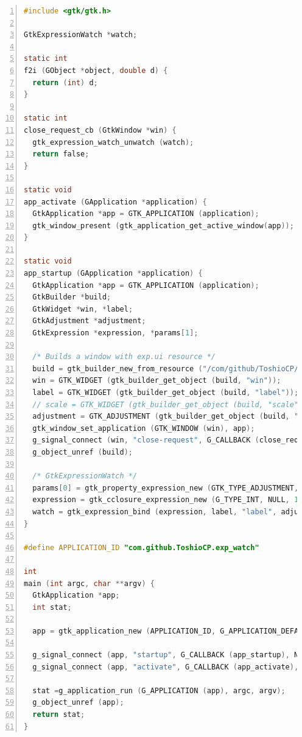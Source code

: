 \begin{lstlisting}[language=C, numbers=left]
#include <gtk/gtk.h>

GtkExpressionWatch *watch;

static int
f2i (GObject *object, double d) {
  return (int) d;
}

static int
close_request_cb (GtkWindow *win) {
  gtk_expression_watch_unwatch (watch);
  return false;
}

static void
app_activate (GApplication *application) {
  GtkApplication *app = GTK_APPLICATION (application);
  gtk_window_present (gtk_application_get_active_window(app));
}

static void
app_startup (GApplication *application) {
  GtkApplication *app = GTK_APPLICATION (application);
  GtkBuilder *build;
  GtkWidget *win, *label;
  GtkAdjustment *adjustment;
  GtkExpression *expression, *params[1];

  /* Builds a window with exp.ui resource */
  build = gtk_builder_new_from_resource ("/com/github/ToshioCP/exp/exp_bind.ui");
  win = GTK_WIDGET (gtk_builder_get_object (build, "win"));
  label = GTK_WIDGET (gtk_builder_get_object (build, "label"));
  // scale = GTK_WIDGET (gtk_builder_get_object (build, "scale"));
  adjustment = GTK_ADJUSTMENT (gtk_builder_get_object (build, "adjustment"));
  gtk_window_set_application (GTK_WINDOW (win), app);
  g_signal_connect (win, "close-request", G_CALLBACK (close_request_cb), NULL);
  g_object_unref (build);

  /* GtkExpressionWatch */
  params[0] = gtk_property_expression_new (GTK_TYPE_ADJUSTMENT, NULL, "value");
  expression = gtk_cclosure_expression_new (G_TYPE_INT, NULL, 1, params, G_CALLBACK (f2i), NULL, NULL);
  watch = gtk_expression_bind (expression, label, "label", adjustment); /* watch takes the ownership of the expression. */
}

#define APPLICATION_ID "com.github.ToshioCP.exp_watch"

int
main (int argc, char **argv) {
  GtkApplication *app;
  int stat;

  app = gtk_application_new (APPLICATION_ID, G_APPLICATION_DEFAULT_FLAGS);

  g_signal_connect (app, "startup", G_CALLBACK (app_startup), NULL);
  g_signal_connect (app, "activate", G_CALLBACK (app_activate), NULL);

  stat =g_application_run (G_APPLICATION (app), argc, argv);
  g_object_unref (app);
  return stat;
}
\end{lstlisting}

